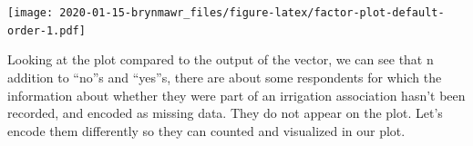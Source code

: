 \documentclass[]{book}
\newenvironment{Shaded}{\begin{snugshade}}{\end{snugshade}}
\newcommand{\KeywordTok}[1]{\textcolor[rgb]{0.13,0.29,0.53}{\textbf{#1}}}
\newcommand{\StringTok}[1]{\textcolor[rgb]{0.31,0.60,0.02}{#1}}
\newcommand{\OperatorTok}[1]{\textcolor[rgb]{0.81,0.36,0.00}{\textbf{#1}}}
\newcommand{\NormalTok}[1]{#1}
\begin{document}
\texttt{[image: 2020-01-15-brynmawr\_files/figure-latex/factor-plot-default-order-1.pdf]}

Looking at the plot compared to the output of the vector, we can see
that n addition to ``no''s and ``yes''s, there are about some
respondents for which the information about whether they were part of an
irrigation association hasn't been recorded, and encoded as missing
data. They do not appear on the plot. Let's encode them differently so
they can counted and visualized in our plot.

\begin{Shaded}
\end{Shaded}
\end{document}
